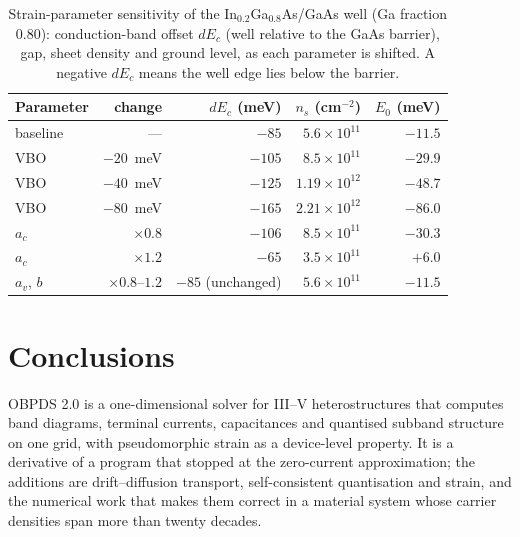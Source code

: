 \documentclass[preprint,12pt]{elsarticle}
\begin{document}
\begin{table}[t]
\centering
\caption{Strain-parameter sensitivity of the In$_{0.2}$Ga$_{0.8}$As/GaAs
well (Ga fraction $0.80$): conduction-band offset $dE_c$ (well relative to
the GaAs barrier), gap, sheet density and ground level, as each parameter is
shifted. A negative $dE_c$ means the well edge lies below the barrier.}
\label{tab:strain_sens}
{\small
\setlength{\tabcolsep}{4pt}
\begin{tabular}{@{}lrrrr@{}}
\toprule
Parameter & change & $dE_c$ (meV) & $n_s$ (cm$^{-2}$) & $E_0$ (meV) \\
\midrule
baseline & --- & $-85$ & $5.6\times10^{11}$ & $-11.5$ \\
VBO & $-20$~meV & $-105$ & $8.5\times10^{11}$ & $-29.9$ \\
VBO & $-40$~meV & $-125$ & $1.19\times10^{12}$ & $-48.7$ \\
VBO & $-80$~meV & $-165$ & $2.21\times10^{12}$ & $-86.0$ \\
$a_c$ & $\times0.8$ & $-106$ & $8.5\times10^{11}$ & $-30.3$ \\
$a_c$ & $\times1.2$ & $-65$ & $3.5\times10^{11}$ & $+6.0$ \\
$a_v$, $b$ & $\times0.8$--$1.2$ & $-85$ (unchanged) & $5.6\times10^{11}$ & $-11.5$ \\
\bottomrule
\end{tabular}}
\end{table}

\section{Conclusions}
\label{sec:conclusions}

OBPDS 2.0 is a one-dimensional solver for III--V heterostructures that
computes band diagrams, terminal currents, capacitances and quantised subband
structure on one grid, with pseudomorphic strain as a device-level property.
It is a derivative of a program that stopped at the zero-current
approximation; the additions are drift--diffusion transport, self-consistent
quantisation and strain, and the numerical work that makes them correct in a
material system whose carrier densities span more than twenty decades.
\end{document}
